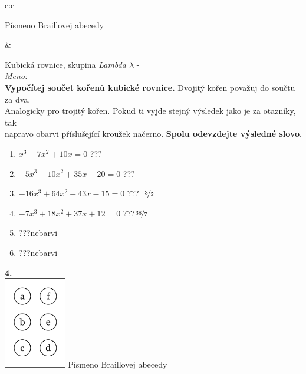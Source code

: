 \documentclass[10pt]{report}
\begin{document}
\begin{tabular}{c:c}
\begin{minipage}[c][99mm][t]{0.49\linewidth}
\begin{center}
\begin{minipage}{0.20\linewidth}
\begin{center}
{\small Písmeno Braillovej abecedy}
\end{center}
\end{minipage}
\end{center}
\end{minipage}
&
\begin{minipage}[c][99mm][t]{0.49\linewidth}
\begin{center}
\vspace{7mm}
{\huge Kubická rovnice, skupina \textit{Lambda $\lambda$} -}\\[4.5mm]
\textit{Meno:}\phantom{xxxxxxxxxxxxxxxxxxxxxxxxxxxxxxxxxxxxxxxxxxxxxxxxxxxxxxxxxxxxxxxxx}\\[3.5mm]
\textbf{Vypočítej součet kořenů kubické rovnice.} Dvojitý kořen považuj do součtu za dva.\\Analogicky pro trojitý kořen. Pokud ti vyjde stejný výsledek jako je za otazníky, tak\\napravo obarvi příslušející kroužek načerno. \textbf{Spolu odevzdejte výsledné slovo}.\\[3mm]
\begin{minipage}{0.77\linewidth}
\begin{center}
\begin{varwidth}{\textwidth}
\begin{enumerate}
\large
\item $x^3-7x^2+10x=0$\quad \dotfill\; ???\;\dotfill {}
\item $-5x^3-10x^2+35x-20=0$\quad \dotfill\; ???\;\dotfill {}
\item $-16x^3+64x^2-43x-15=0$\quad \dotfill\; ???\;\dotfill \quad $\nicefrac{-3}{2}$
\item $-7x^3+18x^2+37x+12=0$\quad \dotfill\; ???\;\dotfill \quad $\nicefrac{38}{7}$
\item \quad \dotfill\; ???\;\dotfill \quad nebarvi
\item \quad \dotfill\; ???\;\dotfill \quad nebarvi
\end{enumerate}
\end{varwidth}
\end{center}
\end{minipage}
\begin{minipage}{0.20\linewidth}
\begin{center}
{\Huge\bfseries 4.} \\[2mm]
\includegraphics[height=40mm]{../images/braille.png}
{\small Písmeno Braillovej abecedy}
\end{center}
\end{minipage}
\end{center}
\end{minipage}

\end{tabular}
\end{document}
